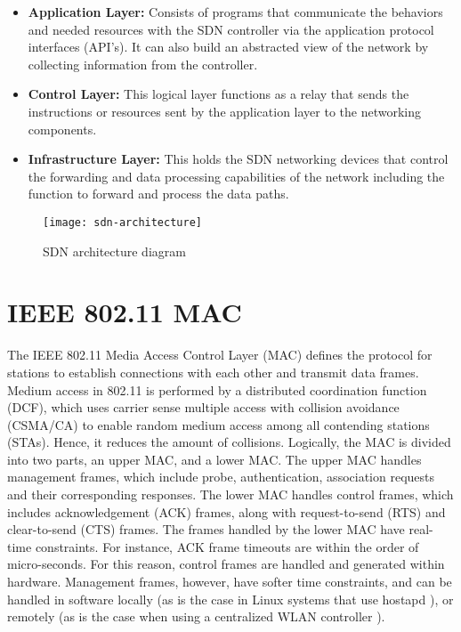 \begin{itemize}
	\item \textbf{Application Layer:}  Consists of programs that communicate the behaviors and needed resources with the SDN controller via the application protocol interfaces (API’s). It can also build an abstracted view of the network by collecting information from the controller.
	\item \textbf{Control Layer:} This logical layer functions as a relay that sends the instructions or resources sent by the application layer to the networking components.
	\item \textbf{Infrastructure Layer:} This holds the SDN networking devices that control the forwarding and data processing capabilities of the network including the function to forward and process the data paths.
\end{itemize}

\begin{figure}
  \centering
  \texttt{[image: sdn-architecture]}
  \caption{SDN architecture diagram\cite{SDN:architecture}}
  \label{fig:sdn-architecture}
\end{figure}

\section{IEEE 802.11 MAC \cite{ieee2012802}}\label{sec:IEEE802.11}

The IEEE 802.11 Media Access Control Layer (MAC) \cite{ieee2012802} defines the protocol for stations to establish connections with each other and transmit data frames.
Medium access in 802.11 is performed by a distributed coordination function (DCF), which uses carrier sense multiple access with collision avoidance (CSMA/CA) to enable random medium access among all contending stations (STAs). Hence, it reduces the amount of collisions. Logically, the MAC is divided into two parts, an upper MAC, and a lower MAC. The upper MAC handles management frames, which include probe, authentication, association requests and their corresponding responses. The lower MAC handles control frames, which includes acknowledgement (ACK) frames, along with request-to-send (RTS) and clear-to-send (CTS) frames. The frames handled by the lower MAC have real-time constraints. For instance, ACK frame timeouts are within the order of micro-seconds. For this reason, control frames are handled and generated within hardware. Management frames, however, have softer time constraints, and can be handled in software locally (as is the case in Linux systems that use hostapd \cite{hostapd}), or remotely (as is the case when using a centralized WLAN controller \cite{RFC5412L97} ).

